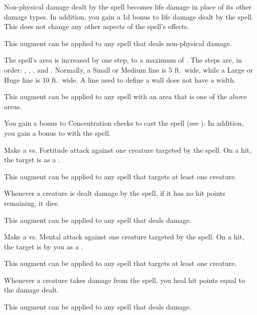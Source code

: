         {
             Non-physical damage dealt by the spell becomes life damage in place of its other damage types.
            In addition, you gain a \plus1d bonus to life damage dealt by the spell.
            This does not change any other aspects of the spell's effects.
            \par This augment can be applied to any spell that deals non-physical damage.

             The spell's area is increased by one step, to a maximum of \areahuge.
            The steps are, in order: \areasmall, \areamed, \arealarge, and \areahuge.
            Normally, a Small or Medium line is 5 ft.\ wide, while a Large or Huge line is 10 ft.\ wide.
            A line used to define a wall does not have a width.
            \par This augment can be applied to any spell with an area that is one of the above areas.

             You gain a  bonus to Concentration checks to cast the spell (see ).
            In addition, you gain a  bonus to  with the spell.

             Make a  vs. Fortitude attack against one creature targeted by the spell.
            On a hit, the target is  as a .
            \par This augment can be applied to any spell that targets at least one creature.

             Whenever a creature is dealt damage by the spell, if it has no hit points remaining, it dies.
            \par This augment can be applied to any spell that deals damage.

             Make a  vs. Mental attack against one creature targeted by the spell.
            On a hit, the target is  by you as a .
            \par This augment can be applied to any spell that targets at least one creature.

             Whenever a creature takes damage from the spell, you heal hit points equal to the damage dealt.
            \par This augment can be applied to any spell that deals damage.

}
